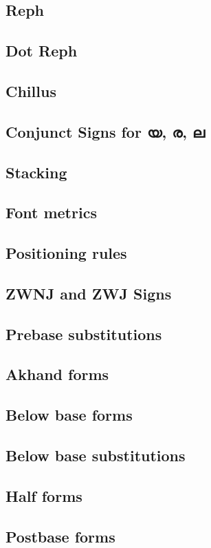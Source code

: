 \subsection {Reph}
\subsection {Dot Reph}
\subsection {Chillus}
\subsection {Conjunct Signs for യ, ര, ല}
\subsection {Stacking}
\subsection {Font metrics} 
\subsection {Positioning rules} 
\subsection {ZWNJ and ZWJ Signs}
\subsection {Prebase substitutions}
\subsection {Akhand forms}
\subsection {Below base forms}
\subsection {Below base substitutions}
\subsection {Half forms}
\subsection {Postbase forms}
